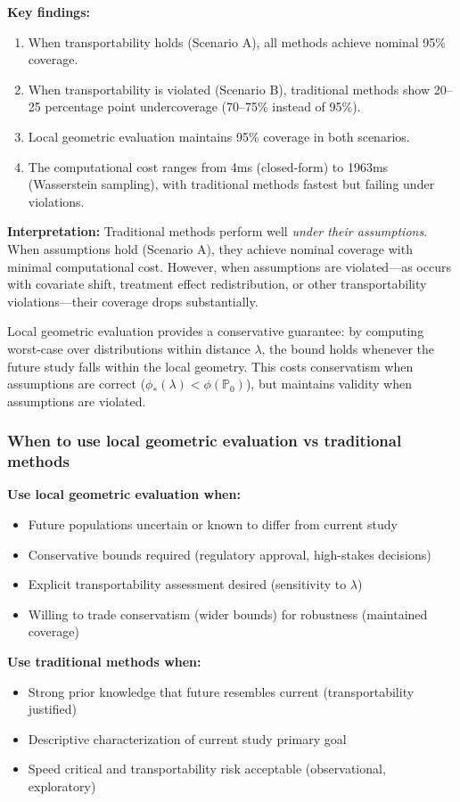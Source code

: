 \documentclass{article}
\newcommand{\PP}{\mathbb{P}}
\begin{document}
\textbf{Key findings:}
\begin{enumerate}
    \item When transportability holds (Scenario A), all methods achieve nominal 95\% coverage.
    \item When transportability is violated (Scenario B), traditional methods show 20--25 percentage point undercoverage (70--75\% instead of 95\%).
    \item Local geometric evaluation maintains 95\% coverage in both scenarios.
    \item The computational cost ranges from 4ms (closed-form) to 1963ms (Wasserstein sampling), with traditional methods fastest but failing under violations.
\end{enumerate}

\textbf{Interpretation:} Traditional methods perform well \emph{under their assumptions}. When assumptions hold (Scenario A), they achieve nominal coverage with minimal computational cost. However, when assumptions are violated---as occurs with covariate shift, treatment effect redistribution, or other transportability violations---their coverage drops substantially.

Local geometric evaluation provides a conservative guarantee: by computing worst-case over distributions within distance $\lambda$, the bound holds whenever the future study falls within the local geometry. This costs conservatism when assumptions are correct ($\phi_*(\lambda) < \phi(\PP_0)$), but maintains validity when assumptions are violated.

\subsubsection{When to use local geometric evaluation vs traditional methods}

\textbf{Use local geometric evaluation when:}
\begin{itemize}
    \item Future populations uncertain or known to differ from current study
    \item Conservative bounds required (regulatory approval, high-stakes decisions)
    \item Explicit transportability assessment desired (sensitivity to $\lambda$)
    \item Willing to trade conservatism (wider bounds) for robustness (maintained coverage)
\end{itemize}

\textbf{Use traditional methods when:}
\begin{itemize}
    \item Strong prior knowledge that future resembles current (transportability justified)
    \item Descriptive characterization of current study primary goal
    \item Speed critical and transportability risk acceptable (observational, exploratory)
\end{itemize}
\end{document}
